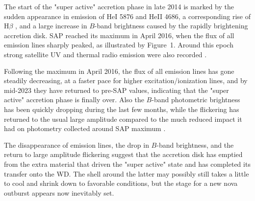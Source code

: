 \documentclass{aastex631}
\begin{document}
The start of the "super active" accretion phase in late 2014 is marked by
the sudden appearance in emission of HeI 5876 and HeII 4686, a corresponding
rise of H$\beta$ \citep[compare the spectra for
2014-11-02 and 2012-09-03 in][]{2016NewA...47....7M}, and a large increase
in $B$-band brightness caused by the rapidly brightening accretion disk. 
SAP reached its maximum in April 2016, when the flux of all emission lines
sharply peaked, as illustrated by Figure~1.  Around this epoch strong
satellite UV and thermal radio emission were also recorded
\citep{2018A&A...619A..61L,2019ApJ...884....8L}.

Following the maximum in April 2016, the flux of all emission lines has
gone steadily decreasing, at a faster pace for higher excitation/ionization
lines, and by mid-2023 they have returned to pre-SAP values, indicating that
the "super active" accretion phase is finally over.  Also the $B$-band
photometric brightness has been quickly dropping during the last few months,
while the flickering has returned to the usual large amplitude
\citep{2023ATel16023....1M} compared to the much reduced impact it had on
photometry collected around SAP maximum \citep{2016ATel.8675....1Z}.

The disappearance of emission lines, the drop in $B$-band brightness, and
the return to large amplitude flickering suggest that the accretion disk has
emptied from the extra material that driven the "super active" state and has
completed its transfer onto the WD.  The shell around the latter may
possibly still takes a little to cool and shrink down to favorable
conditions, but the stage for a new nova outburst appears now inevitably
set.

{}



\end{document}

